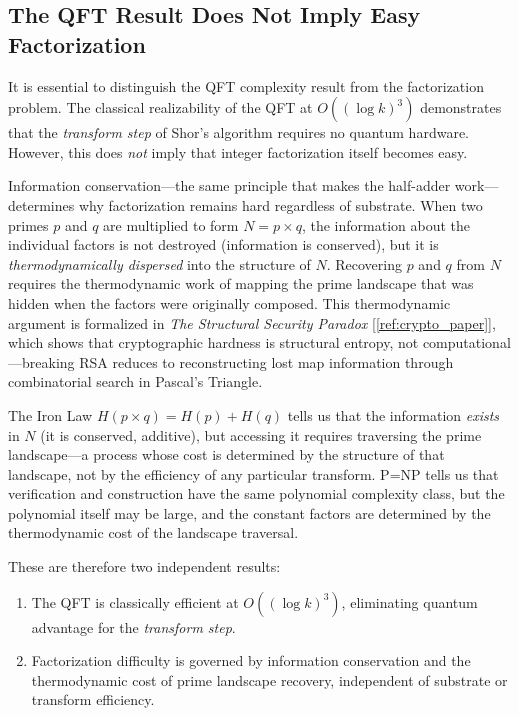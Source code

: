 \documentclass[11pt,a4paper]{article}
\begin{document}
\subsection{The QFT Result Does Not Imply Easy Factorization}
\label{subsec:qft_factor}

It is essential to distinguish the QFT complexity result from the factorization problem. The classical realizability of the QFT at $O((\log k)^3)$ demonstrates that the \emph{transform step} of Shor's algorithm requires no quantum hardware. However, this does \emph{not} imply that integer factorization itself becomes easy.

Information conservation---the same principle that makes the half-adder work---determines why factorization remains hard regardless of substrate. When two primes $p$ and $q$ are multiplied to form $N = p \times q$, the information about the individual factors is not destroyed (information is conserved), but it is \emph{thermodynamically dispersed} into the structure of $N$. Recovering $p$ and $q$ from $N$ requires the thermodynamic work of mapping the prime landscape that was hidden when the factors were originally composed. This thermodynamic argument is formalized in \emph{The Structural Security Paradox} [\ref{ref:crypto_paper}], which shows that cryptographic hardness is structural entropy, not computational---breaking RSA reduces to reconstructing lost map information through combinatorial search in Pascal's Triangle.

The Iron Law $H(p \times q) = H(p) + H(q)$ tells us that the information \emph{exists} in $N$ (it is conserved, additive), but accessing it requires traversing the prime landscape---a process whose cost is determined by the structure of that landscape, not by the efficiency of any particular transform. P=NP tells us that verification and construction have the same polynomial complexity class, but the polynomial itself may be large, and the constant factors are determined by the thermodynamic cost of the landscape traversal.

These are therefore two independent results:
\begin{enumerate}
    \item The QFT is classically efficient at $O((\log k)^3)$, eliminating quantum advantage for the \emph{transform step}.
    \item Factorization difficulty is governed by information conservation and the thermodynamic cost of prime landscape recovery, independent of substrate or transform efficiency.
\end{enumerate}
\end{document}
